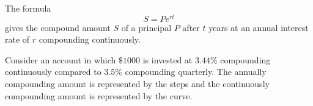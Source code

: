 \begin{definition}
    The formula
    \[S = P e^{rt}\]
    gives the compound amount \(S\) of a principal \(P\) after \(t\) years at an annual interest rate of \(r\) compounding continuously.
\end{definition}

Consider an account in which \(\$1000\) is invested at \(3.44\%\) compounding continuously compared to \(3.5\%\) compounding quarterly. The annually compounding amount is represented by the steps and the continuously compounding amount is represented by the curve.

